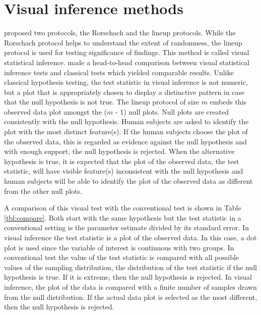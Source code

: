 \section{Visual inference methods} \label{sec:inference}

\cite{buja:2009} proposed two protocols, the Rorschach and the lineup protocols. While the Rorschach protocol helps to understand the extent of randomness, the lineup protocol is  used for testing significance of findings. This method is called visual statistical inference. \cite{majumder:2011} made a head-to-head comparison between visual statistical inference tests and classical tests which yielded comparable results. Unlike classical hypothesis testing, the test statistic in visual inference is not numeric, but a plot that is appropriately chosen to display a  distinctive pattern in case that the null hypothesis is not true. The lineup protocol of size $m$ embeds this observed data plot amongst the ($m$ - 1) null plots. Null plots are created  consistently with the null hypothesis. Human subjects are asked to identify the plot with the most distinct feature(s). If the human subjects choose the plot of the observed data, this is regarded as evidence against the null hypothesis and with enough support, the null hypothesis is rejected. When the alternative hypothesis is true, it is expected that the plot of the observed data, the test statistic, will have visible feature(s) inconsistent with the null hypothesis and human subjects will be able to identify the plot of the observed data as different from  the other null plots. 

A comparison of this visual test with the conventional test is shown in Table \ref{tbl:compare}. Both start with the same hypothesis but the test statistic in a conventional setting is the parameter estimate divided by its standard error. In visual inference the test statistic is a plot of the observed data. In this case, a dot plot is used since the variable of interest is continuous with two groups. In conventional test the value of the test statistic is compared with all possible values of the sampling distribution, the distribution of the test statistic if the null hypothesis is true. If it is extreme, then the null hypothesis is rejected. In visual inference, the plot of the data is compared with a finite number of samples drawn from the null distribution. If the actual data plot is selected as the most different, then the null hypothesis is rejected. 


